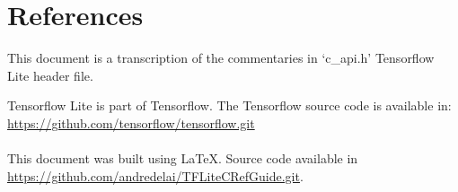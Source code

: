 \documentclass{ol-softwaremanual}
\begin{document}
\section{References}

This document is a transcription of the commentaries in `c\_api.h' Tensorflow Lite header file.

Tensorflow Lite is part of Tensorflow. The Tensorflow source code is available in: \url{https://github.com/tensorflow/tensorflow.git}\\\\

This document was built using \LaTeX. Source code available in \url{https://github.com/andredelai/TFLiteCRefGuide.git}.
\end{document}
